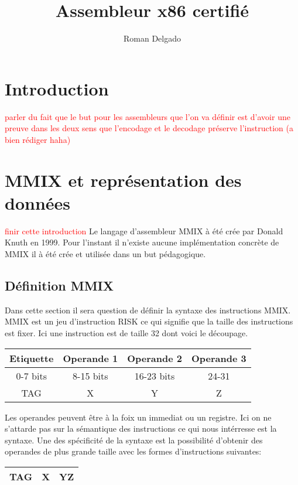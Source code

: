\documentclass {article}
\title{Assembleur x86 certifié}
\author{Roman Delgado}
\date{}
\theoremstyle{definition}
\theoremstyle{remark}
\newcommand{\todo}[1]{\textcolor{red}{#1}}
\begin{document}
\maketitle



\vfill
\setcounter{tocdepth}{2}
\tableofcontents
\vfill


\section{Introduction}

\todo{parler du fait que le but pour les assembleurs que l'on va définir est d'avoir une preuve dans les deux sens
  que l'encodage et le decodage préserve l'instruction (a bien rédiger haha)}


\section{MMIX et représentation des données}
\label{partieMMIX}

\todo{finir cette introduction}
Le langage d'assembleur MMIX à été crée par Donald Knuth en 1999.
Pour l'instant il n'existe aucune implémentation concrète de MMIX il
à été crée et utilisée dans un but pédagogique.







\subsection{Définition MMIX}

Dans cette section il sera question de définir la syntaxe des instructions MMIX.
MMIX est un jeu d'instruction RISK ce qui signifie que la taille des instructions
est fixer. Ici une instruction est de taille 32 dont voici le découpage.

\begin{tabular}{|c|c|c|c|}
  \hline
  Etiquette & Operande 1 & Operande 2 & Operande 3\\
  \hline
  0-7 bits & 8-15 bits & 16-23 bits & 24-31  \\
  \hline
  TAG & X & Y & Z \\
  \hline
\end{tabular}
Les operandes peuvent être à la foix un immediat ou un registre.
Ici on ne s'attarde pas sur la sémantique des instructions ce qui nous intérresse
est la syntaxe. Une des spécificité de la syntaxe est la possibilité d'obtenir des operandes
de plus grande taille avec les formes d'instructions suivantes:\\
\begin{tabular}{|c|c|c|}
  \hline 
  TAG & X & YZ \\
  \hline
\end{tabular}
\end{document}
